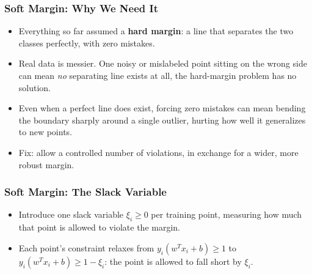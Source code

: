 \begin{frame}[fragile] \frametitle{Soft Margin: Why We Need It}
\begin{itemize}
\item Everything so far assumed a \textbf{hard margin}: a line that separates the two classes perfectly, with zero mistakes.
\item Real data is messier. One noisy or mislabeled point sitting on the wrong side can mean \emph{no} separating line exists at all, the hard-margin problem has no solution.
\item Even when a perfect line does exist, forcing zero mistakes can mean bending the boundary sharply around a single outlier, hurting how well it generalizes to new points.
\item Fix: allow a controlled number of violations, in exchange for a wider, more robust margin.
\end{itemize}
\end{frame}

\begin{frame}[fragile] \frametitle{Soft Margin: The Slack Variable}
\begin{itemize}
\item Introduce one slack variable $\xi_i \geq 0$ per training point, measuring how much that point is allowed to violate the margin.
\end{itemize}
\begin{center}
\end{center}
\begin{itemize}
\item Each point's constraint relaxes from $y_i(w^Tx_i+b)\geq 1$ to $y_i(w^Tx_i+b)\geq 1-\xi_i$: the point is allowed to fall short by $\xi_i$.
\end{itemize}
\end{frame}

